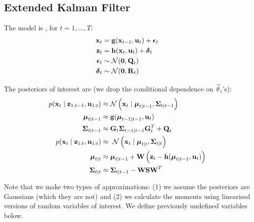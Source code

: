 \subsection{Extended Kalman Filter}
The model is , for $t = 1, \dotsc, T$:
\begin{align}
	\boldsymbol{\mathbf{x}}_t	&= \boldsymbol{\mathbf{g}}(\boldsymbol{\mathbf{x}}_{t - 1}, \boldsymbol{\mathbf{u}}_t) + \boldsymbol{\mathbf{\epsilon}}_t \\
	\boldsymbol{\mathbf{z}}_t	&= \boldsymbol{\mathbf{h}}(\boldsymbol{\mathbf{x}}_t, \boldsymbol{\mathbf{u}}_t) + \boldsymbol{\mathbf{\delta}}_t \\
	\boldsymbol{\mathbf{\epsilon}}_t	&\sim \operatorname{\mathcal N}(\boldsymbol{\mathbf{0}}, \boldsymbol{\mathbf{Q}}_t) \\
	\boldsymbol{\mathbf{\delta}}_t	&\sim \operatorname{\mathcal N}(\boldsymbol{\mathbf{0}}, \boldsymbol{\mathbf{R}}_t)
\end{align}

The posteriors of interest are (we drop the conditional dependence on $\vec \theta_t$'s):
\begin{align}
	p(\vec x_t \mid \vec z_{1:t - 1}, \vec u_{1:t})	&\approx \Gauss\left(\vec x_t \mid \vec \mu_{t \mid t - 1}, \vec\Sigma_{t \mid t - 1}\right) \\
	\vec \mu_{t \mid t - 1}							&\approx \vec g(\vec \mu_{t - 1 \mid t - 1}, \vec u_t) \\
	\vec \Sigma_{t \mid t - 1}						&\approx \vec G_t \vec \Sigma_{t - 1 \mid t - 1} \vec G_t^T + \vec Q_t \\
	p(\vec x_t \mid \vec z_{1:t}, \vec u_{1:t}) 	&\approx\ \Gauss\left(\vec x_t \mid \vec \mu_{t \mid t}, \vec\Sigma_{t \mid t}\right) \\
	\vec \mu_{t \mid t}								&\approx \vec \mu_{t \mid t - 1} + \vec W \left(\vec z_t - \vec h(\vec \mu_{t \mid t - 1}, \vec u_t)\right) \\
	\vec \Sigma_{t \mid t}							&\approx \vec \Sigma_{t \mid t - 1} - \vec W \vec S \vec W^T
\end{align}

Note that we make two types of approximations: (1) we assume the posteriors are Gaussians (which they are not) and (2) we calculate the moments using linearised versions of random variables of interest. We define previously undefined variables below.

